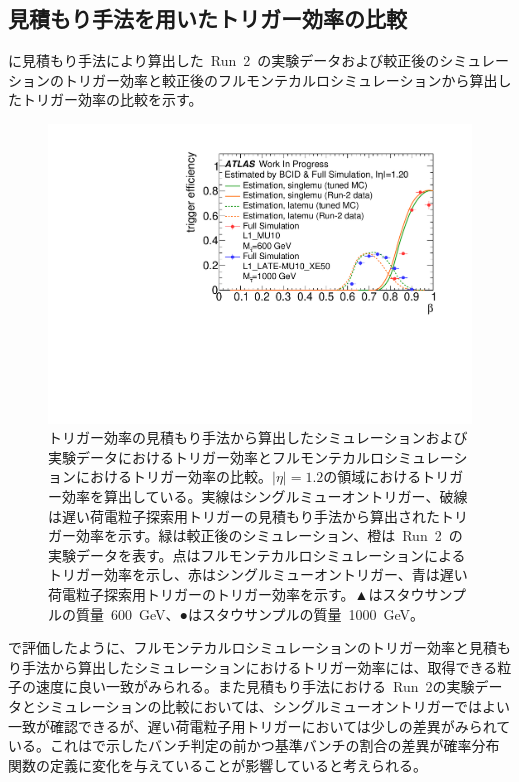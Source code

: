 \subsection{見積もり手法を用いたトリガー効率の比較}
に見積もり手法により算出した~Run~2~の実験データおよび較正後のシミュレーションのトリガー効率と較正後のフルモンテカルロシミュレーションから算出したトリガー効率の比較を示す。
\begin{figure}[tbp]
    \centering   
    \includegraphics[width=\textwidth,page=1]{img/rec/tunetune.pdf}
    \caption[トリガー効率の見積もり手法から算出したシミュレーションおよび実験データにおけるトリガー効率とフルモンテカルロシミュレーションにおけるトリガー効率の比較]{トリガー効率の見積もり手法から算出したシミュレーションおよび実験データにおけるトリガー効率とフルモンテカルロシミュレーションにおけるトリガー効率の比較。$|\eta|=1.2$の領域におけるトリガー効率を算出している。実線はシングルミューオントリガー、破線は遅い荷電粒子探索用トリガーの見積もり手法から算出されたトリガー効率を示す。緑は較正後のシミュレーション、橙は~Run~2~の実験データを表す。点はフルモンテカルロシミュレーションによるトリガー効率を示し、赤はシングルミューオントリガー、青は遅い荷電粒子探索用トリガーのトリガー効率を示す。▲はスタウサンプルの質量~600~GeV、●はスタウサンプルの質量~1000~GeV。}\label{fig:rectritune}
\end{figure}
で評価したように、フルモンテカルロシミュレーションのトリガー効率と見積もり手法から算出したシミュレーションにおけるトリガー効率には、取得できる粒子の速度に良い一致がみられる。また見積もり手法における~Run~2の実験データとシミュレーションの比較においては、シングルミューオントリガーではよい一致が確認できるが、遅い荷電粒子用トリガーにおいては少しの差異がみられている。これはで示したバンチ判定の前かつ基準バンチの割合の差異が確率分布関数の定義に変化を与えていることが影響していると考えられる。
